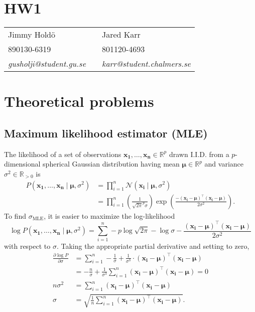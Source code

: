 \documentclass[a4paper,11pt]{article}
\DeclareMathOperator{\given}{\mid}
\begin{document}
\section*{HW1}

\begin{tabular*}{0.9\textwidth}{@{\extracolsep{\fill} } lll}
Jimmy Hold\"{o} & & Jared Karr\\
890130-6319 & & 801120-4693\\
\it{gusholji@student.gu.se} & & \it{karr@student.chalmers.se}\\
\end{tabular*}

\section{Theoretical problems}
\subsection{Maximum likelihood estimator (MLE)}
The likelihood of a set of observations $\mathbf{x_1},\dots,\mathbf{x_n}\in\mathbb{R}^p$ drawn I.I.D. from a $p$-dimensional spherical Gaussian distribution having mean $\boldsymbol\mu\in\mathbb{R}^p$ and variance $\sigma^2\in\mathbb{R}_{>0}$ is
\begin{align*}
  P(\mathbf{x_1},\dots,\mathbf{x_n}\given \boldsymbol\mu,\sigma^2)
    &=\prod_{i=1}^n\mathcal{N}(\mathbf{x_i}\given \boldsymbol\mu, \sigma^2)\\
    &=\prod_{i=1}^n\left(
        \frac{1}{\sqrt{2\pi}^p\sigma}
      \right)\exp\left(
        \frac{-(\mathbf{x_i}-\boldsymbol\mu)^\top(\mathbf{x_i}-\boldsymbol\mu)}
             {2\sigma^2}
      \right).
\end{align*}
To find $\sigma_\textrm{MLE}$, it is easier to maximize the log-likelihood
\begin{equation*}
  \log P(\mathbf{x_1},\dots,\mathbf{x_n}\given\boldsymbol\mu,\sigma^2)
    =\sum_{i=1}^n
      -p\log\sqrt{2\pi}
      -\log\sigma
      -\frac{(\mathbf{x_i}-\boldsymbol\mu)^\top(\mathbf{x_i}-\boldsymbol\mu)}{2\sigma^2} 
\end{equation*}
with respect to $\sigma$. Taking the appropriate partial derivative and setting to zero,
\begin{align*}
\frac{\partial\log P}{\partial\sigma}
  &=\sum_{i=1}^n
    -\frac{1}{\sigma}
    +\frac{1}{\sigma^3}\cdot(\mathbf{x_i}-\boldsymbol\mu)^\top(\mathbf{x_i}-\boldsymbol\mu)\\
  &=-\frac{n}{\sigma}
    +\frac{1}{\sigma^3}\sum_{i=1}^n(\mathbf{x_i}-\boldsymbol\mu)^\top(\mathbf{x_i}-\boldsymbol\mu)=0\\
n\sigma^2
  &=\sum_{i=1}^n(\mathbf{x_i}-\boldsymbol\mu)^\top(\mathbf{x_i}-\boldsymbol\mu)\\
\sigma&=\sqrt{\frac{1}{n}\sum_{i=1}^n(\mathbf{x_i}-\boldsymbol\mu)^\top(\mathbf{x_i}-\boldsymbol\mu)}.
\end{align*}
\end{document}

